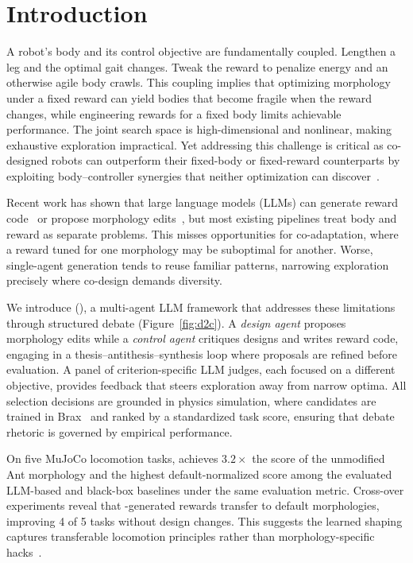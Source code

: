 \section{Introduction}

A robot's body and its control objective are fundamentally coupled. Lengthen a leg and the optimal gait changes. Tweak the reward to penalize energy and an otherwise agile body crawls. This coupling implies that optimizing morphology under a fixed reward can yield bodies that become fragile when the reward changes, while engineering rewards for a fixed body limits achievable performance. The joint search space is high-dimensional and nonlinear, making exhaustive exploration impractical. Yet addressing this challenge is critical as co-designed robots can outperform their fixed-body or fixed-reward counterparts by exploiting body--controller synergies that neither optimization can discover~\cite{sims1994evolving}.

Recent work has shown that large language models (LLMs) can generate reward code~\cite{ma2024eureka, ma2024dreureka} or propose morphology edits~\cite{qiu2026robomorph, ringel2025text2robot}, but most existing pipelines treat body and reward as separate problems. This misses opportunities for co-adaptation, where a reward tuned for one morphology may be suboptimal for another. Worse, single-agent generation tends to reuse familiar patterns, narrowing exploration precisely where co-design demands diversity.

We introduce \method{} (\abbrev{}), a multi-agent LLM framework that addresses these limitations through structured debate (Figure~\ref{fig:d2c}). A \emph{design agent} proposes morphology edits while a \emph{control agent} critiques designs and writes reward code, engaging in a thesis--antithesis--synthesis loop where proposals are refined before evaluation. A panel of criterion-specific LLM judges, each focused on a different objective, provides feedback that steers exploration away from narrow optima. All selection decisions are grounded in physics simulation, where candidates are trained in Brax~\cite{brax2021github} and ranked by a standardized task score, ensuring that debate rhetoric is governed by empirical performance.

On five MuJoCo locomotion tasks, \abbrev{} achieves $3.2\times$ the score of the unmodified Ant morphology and the highest default-normalized score among the evaluated LLM-based and black-box baselines under the same evaluation metric. Cross-over experiments reveal that \abbrev{}-generated rewards transfer to default morphologies, improving 4 of 5 tasks without design changes. This suggests the learned shaping captures transferable locomotion principles rather than morphology-specific hacks~\cite{ng1999policy}.

